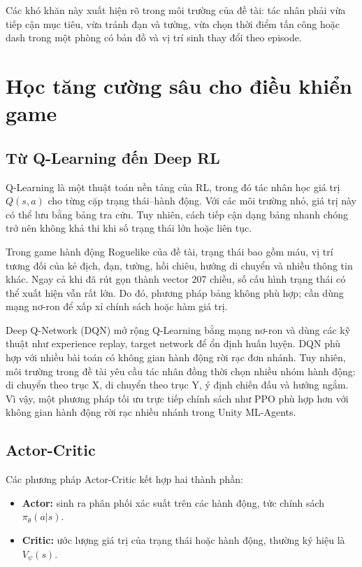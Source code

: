 Các khó khăn này xuất hiện rõ trong môi trường của đề tài: tác nhân phải vừa tiếp cận mục tiêu, vừa tránh đạn và tường, vừa chọn thời điểm tấn công hoặc dash trong một phòng có bản đồ và vị trí sinh thay đổi theo episode.

\section{Học tăng cường sâu cho điều khiển game}
\subsection{Từ Q-Learning đến Deep RL}

Q-Learning là một thuật toán nền tảng của RL, trong đó tác nhân học giá trị $Q(s,a)$ cho từng cặp trạng thái--hành động. Với các môi trường nhỏ, giá trị này có thể lưu bằng bảng tra cứu. Tuy nhiên, cách tiếp cận dạng bảng nhanh chóng trở nên không khả thi khi số trạng thái lớn hoặc liên tục.

Trong game hành động Roguelike của đề tài, trạng thái bao gồm máu, vị trí tương đối của kẻ địch, đạn, tường, hồi chiêu, hướng di chuyển và nhiều thông tin khác. Ngay cả khi đã rút gọn thành vector 207 chiều, số cấu hình trạng thái có thể xuất hiện vẫn rất lớn. Do đó, phương pháp bảng không phù hợp; cần dùng mạng nơ-ron để xấp xỉ chính sách hoặc hàm giá trị.

Deep Q-Network (DQN) mở rộng Q-Learning bằng mạng nơ-ron và dùng các kỹ thuật như experience replay, target network để ổn định huấn luyện. DQN phù hợp với nhiều bài toán có không gian hành động rời rạc đơn nhánh. Tuy nhiên, môi trường trong đề tài yêu cầu tác nhân đồng thời chọn nhiều nhóm hành động: di chuyển theo trục X, di chuyển theo trục Y, ý định chiến đấu và hướng ngắm. Vì vậy, một phương pháp tối ưu trực tiếp chính sách như PPO phù hợp hơn với không gian hành động rời rạc nhiều nhánh trong Unity ML-Agents.

\subsection{Actor-Critic}

Các phương pháp Actor-Critic kết hợp hai thành phần:

\begin{itemize}
    \item \textbf{Actor:} sinh ra phân phối xác suất trên các hành động, tức chính sách $\pi_\theta(a|s)$.
    \item \textbf{Critic:} ước lượng giá trị của trạng thái hoặc hành động, thường ký hiệu là $V_\psi(s)$.
\end{itemize}


